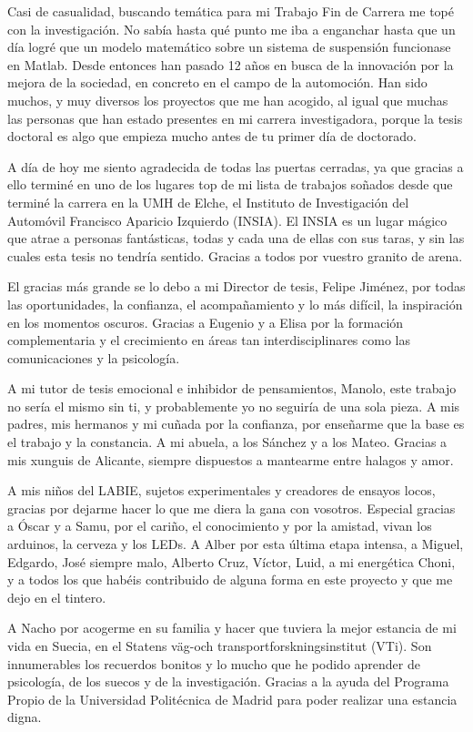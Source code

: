 Casi de casualidad, buscando temática para mi Trabajo Fin de Carrera me topé con la investigación. No sabía hasta qué punto me iba a enganchar hasta que un día logré que un modelo matemático sobre un sistema de suspensión funcionase en Matlab. Desde entonces han pasado 12 años en busca de la innovación por la mejora de la sociedad, en concreto en el campo de la automoción. Han sido muchos, y muy diversos los proyectos que me han acogido, al igual que muchas las personas que han estado presentes en mi carrera investigadora, porque la tesis doctoral es algo que empieza mucho antes de tu primer día de doctorado. 

A día de hoy me siento agradecida de todas las puertas cerradas, ya que gracias a ello terminé en uno de los lugares top de mi lista de trabajos soñados desde que terminé la carrera en la UMH de Elche, el Instituto de Investigación del Automóvil Francisco Aparicio Izquierdo (INSIA). El INSIA es un lugar mágico que atrae a personas fantásticas, todas y cada una de ellas con sus taras, y sin las cuales esta tesis no tendría sentido. Gracias a todos por vuestro granito de arena.

El gracias más grande se lo debo a mi Director de tesis, Felipe Jiménez, por todas las oportunidades, la confianza, el acompañamiento y lo más difícil, la inspiración en los momentos oscuros. Gracias a Eugenio y a Elisa por la formación complementaria y el crecimiento en áreas tan interdisciplinares como las comunicaciones y la psicología. 

A mi tutor de tesis emocional e inhibidor de pensamientos, Manolo, este trabajo no sería el mismo sin ti, y probablemente yo no seguiría de una sola pieza. A mis padres, mis hermanos y mi cuñada por la confianza, por enseñarme que la base es el trabajo y la constancia. A mi abuela, a los Sánchez y a los Mateo. Gracias a mis xunguis de Alicante, siempre dispuestos a mantearme entre halagos y amor. 

A mis niños del LABIE, sujetos experimentales y creadores de ensayos locos, gracias por dejarme hacer lo que me diera la gana con vosotros. Especial gracias a Óscar y a Samu, por el cariño, el conocimiento y por la amistad, vivan los arduinos, la cerveza y los LEDs. A Alber por esta última etapa intensa, a Miguel, Edgardo, José siempre malo, Alberto Cruz, Víctor, Luid, a mi energética Choni, y a todos los que habéis contribuido de alguna forma en este proyecto y que me dejo en el tintero.

A Nacho por acogerme en su familia y hacer que tuviera la mejor estancia de mi vida en Suecia, en el Statens väg-och transportforskningsinstitut (VTi). Son innumerables los recuerdos bonitos y lo mucho que he podido aprender de psicología, de los suecos y de la investigación. Gracias a la ayuda del Programa Propio de la Universidad Politécnica de Madrid para poder realizar una estancia digna.

